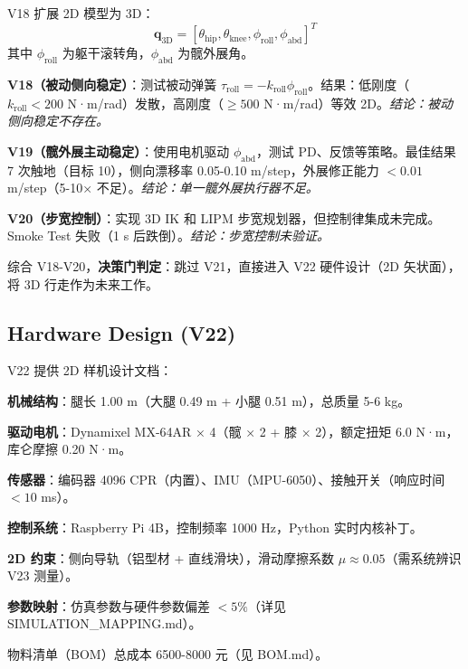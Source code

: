 V18 扩展 2D 模型为 3D：
\begin{equation}
    \mathbf{q}_{\text{3D}} = [\theta_{\text{hip}}, \theta_{\text{knee}}, \phi_{\text{roll}}, \phi_{\text{abd}}]^T
\end{equation}
其中 $\phi_{\text{roll}}$ 为躯干滚转角，$\phi_{\text{abd}}$ 为髋外展角。

\textbf{V18（被动侧向稳定）}：测试被动弹簧 $\tau_{\text{roll}} = -k_{\text{roll}} \phi_{\text{roll}}$。结果：低刚度（$k_{\text{roll}} < 200$ N·m/rad）发散，高刚度（$\geq 500$ N·m/rad）等效 2D。\textit{结论：被动侧向稳定不存在。}

\textbf{V19（髋外展主动稳定）}：使用电机驱动 $\phi_{\text{abd}}$，测试 PD、反馈等策略。最佳结果 7 次触地（目标 10），侧向漂移率 0.05-0.10 m/step，外展修正能力 $<0.01$ m/step（5-10× 不足）。\textit{结论：单一髋外展执行器不足。}

\textbf{V20（步宽控制）}：实现 3D IK 和 LIPM 步宽规划器，但控制律集成未完成。Smoke Test 失败（1 s 后跌倒）。\textit{结论：步宽控制未验证。}

综合 V18-V20，\textbf{决策门判定}：跳过 V21，直接进入 V22 硬件设计（2D 矢状面），将 3D 行走作为未来工作。

\subsection{Hardware Design (V22)}

V22 提供 2D 样机设计文档：

\textbf{机械结构}：腿长 1.00 m（大腿 0.49 m + 小腿 0.51 m），总质量 5-6 kg。

\textbf{驱动电机}：Dynamixel MX-64AR × 4（髋 × 2 + 膝 × 2），额定扭矩 6.0 N·m，库仑摩擦 0.20 N·m。

\textbf{传感器}：编码器 4096 CPR（内置）、IMU（MPU-6050）、接触开关（响应时间 $<10$ ms）。

\textbf{控制系统}：Raspberry Pi 4B，控制频率 1000 Hz，Python 实时内核补丁。

\textbf{2D 约束}：侧向导轨（铝型材 + 直线滑块），滑动摩擦系数 $\mu \approx 0.05$（需系统辨识 V23 测量）。

\textbf{参数映射}：仿真参数与硬件参数偏差 $<5\%$（详见 SIMULATION\_MAPPING.md）。

物料清单（BOM）总成本 6500-8000 元（见 BOM.md）。
